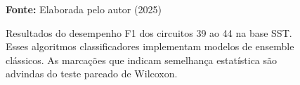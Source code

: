 \begin{figure}
\caption{Resultados do desempenho F1 dos circuitos 39 ao 44 na base \gls{SST}. Esses algoritmos classificadores implementam modelos de ensemble clássicos. As marcações que indicam semelhança estatística são advindas do teste pareado de Wilcoxon.}
\label{fig:f1:sst:g8}
     \centering
    \centering

      \par\medskip\ABNTEXfontereduzida\selectfont\textbf{Fonte:} Elaborada pelo autor (2025) \par\medskip
\end{figure}